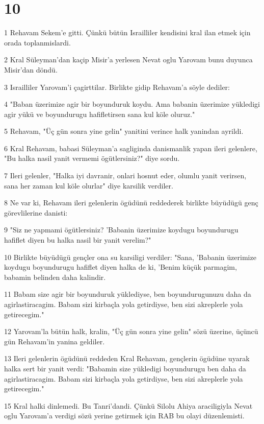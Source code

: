 \chapter{10}

\par 1 Rehavam Sekem'e gitti. Çünkü bütün Israilliler kendisini kral ilan etmek için orada toplanmislardi.
\par 2 Kral Süleyman'dan kaçip Misir'a yerlesen Nevat oglu Yarovam bunu duyunca Misir'dan döndü.
\par 3 Israilliler Yarovam'i çagirttilar. Birlikte gidip Rehavam'a söyle dediler:
\par 4 "Baban üzerimize agir bir boyunduruk koydu. Ama babanin üzerimize yükledigi agir yükü ve boyundurugu hafifletirsen sana kul köle oluruz."
\par 5 Rehavam, "Üç gün sonra yine gelin" yanitini verince halk yanindan ayrildi.
\par 6 Kral Rehavam, babasi Süleyman'a sagliginda danismanlik yapan ileri gelenlere, "Bu halka nasil yanit vermemi ögütlersiniz?" diye sordu.
\par 7 Ileri gelenler, "Halka iyi davranir, onlari hosnut eder, olumlu yanit verirsen, sana her zaman kul köle olurlar" diye karsilik verdiler.
\par 8 Ne var ki, Rehavam ileri gelenlerin ögüdünü reddederek birlikte büyüdügü genç görevlilerine danisti:
\par 9 "Siz ne yapmami ögütlersiniz? 'Babanin üzerimize koydugu boyundurugu hafiflet diyen bu halka nasil bir yanit verelim?"
\par 10 Birlikte büyüdügü gençler ona su karsiligi verdiler: "Sana, 'Babanin üzerimize koydugu boyundurugu hafiflet diyen halka de ki, 'Benim küçük parmagim, babamin belinden daha kalindir.
\par 11 Babam size agir bir boyunduruk yüklediyse, ben boyundurugunuzu daha da agirlastiracagim. Babam sizi kirbaçla yola getirdiyse, ben sizi akreplerle yola getirecegim."
\par 12 Yarovam'la bütün halk, kralin, "Üç gün sonra yine gelin" sözü üzerine, üçüncü gün Rehavam'in yanina geldiler.
\par 13 Ileri gelenlerin ögüdünü reddeden Kral Rehavam, gençlerin ögüdüne uyarak halka sert bir yanit verdi: "Babamin size yükledigi boyundurugu ben daha da agirlastiracagim. Babam sizi kirbaçla yola getirdiyse, ben sizi akreplerle yola getirecegim."
\par 15 Kral halki dinlemedi. Bu Tanri'dandi. Çünkü Silolu Ahiya araciligiyla Nevat oglu Yarovam'a verdigi sözü yerine getirmek için RAB bu olayi düzenlemisti.
